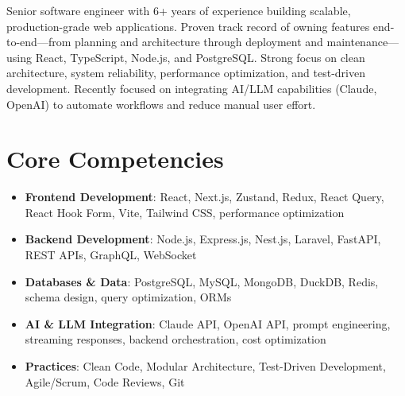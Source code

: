 \documentclass[11pt,a4paper,sans]{moderncv}
\begin{document}
\makecvtitle


\vspace{6pt}
\small{Senior software engineer with 6+ years of experience building scalable, production-grade web applications. Proven track record of owning features end-to-end—from planning and architecture through deployment and maintenance—using React, TypeScript, Node.js, and PostgreSQL. Strong focus on clean architecture, system reliability, performance optimization, and test-driven development. Recently focused on integrating AI/LLM capabilities (Claude, OpenAI) to automate workflows and reduce manual user effort.}


\section{Core Competencies}
\vspace{1pt}
\begin{itemize}

\item \textbf{Frontend Development}: React, Next.js, Zustand, Redux, React Query, React Hook Form, Vite, Tailwind CSS, performance optimization

\item \textbf{Backend Development}: Node.js, Express.js, Nest.js, Laravel, FastAPI, REST APIs, GraphQL, WebSocket

\item \textbf{Databases \& Data}: PostgreSQL, MySQL, MongoDB, DuckDB, Redis, schema design, query optimization, ORMs

\item \textbf{AI \& LLM Integration}: Claude API, OpenAI API, prompt engineering, streaming responses, backend orchestration, cost optimization

\item \textbf{Practices}: Clean Code, Modular Architecture, Test-Driven Development, Agile/Scrum, Code Reviews, Git

\end{itemize}

\end{document}
